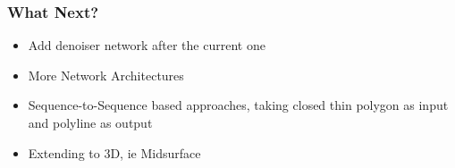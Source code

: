 \begin{frame}[fragile]\frametitle{What Next?}
	\begin{itemize}
	\item Add denoiser network after the current one
	\item More Network Architectures
	\item Sequence-to-Sequence based approaches, taking closed thin polygon as input and polyline as output
	\item Extending to 3D, ie Midsurface
	\end{itemize}	
\end{frame}
